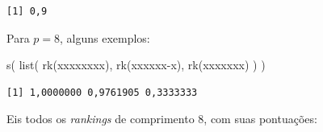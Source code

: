 \documentclass[
  letterpaper,
  DIV=11,
  numbers=noendperiod]{scrreprt}
\newenvironment{Shaded}{\begin{snugshade}}{\end{snugshade}}
\newcommand{\FunctionTok}[1]{\textcolor[rgb]{0.28,0.35,0.67}{#1}}
\newcommand{\NormalTok}[1]{\textcolor[rgb]{0.00,0.23,0.31}{#1}}
\newcommand{\StringTok}[1]{\textcolor[rgb]{0.13,0.47,0.30}{#1}}
\begin{document}
\begin{verbatim}
[1] 0,9
\end{verbatim}

Para $p = 8$, alguns exemplos:

\begin{Shaded}
\begin{Highlighting}[]
\FunctionTok{s}\NormalTok{(}
  \FunctionTok{list}\NormalTok{(}
    \FunctionTok{rk}\NormalTok{(}\StringTok{\textquotesingle{}xxxxxxxx\textquotesingle{}}\NormalTok{),}
    \FunctionTok{rk}\NormalTok{(}\StringTok{\textquotesingle{}xxxxxx{-}x\textquotesingle{}}\NormalTok{),}
    \FunctionTok{rk}\NormalTok{(}\StringTok{\textquotesingle{}{-}xxxxxxx\textquotesingle{}}\NormalTok{)}
\NormalTok{  )}
\NormalTok{)}
\end{Highlighting}
\end{Shaded}

\begin{verbatim}
[1] 1,0000000 0,9761905 0,3333333
\end{verbatim}

Eis todos os \emph{rankings} de comprimento $8$, com suas pontuações:
\end{document}
